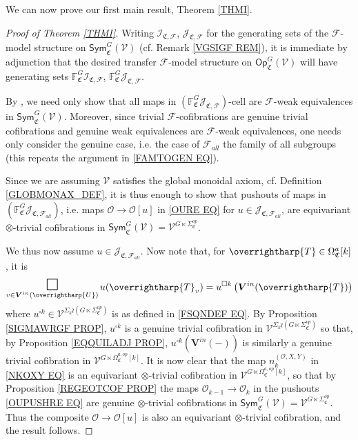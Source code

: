 \documentclass[a4paper,10pt
,draft
]{article}%
\numberwithin{equation}{section}
\numberwithin{figure}{section}
\theoremstyle{definition} %
\newcommand{\vect}[1]{\text{\overrightharp{\ensuremath{#1}}}}
\newcommand{\F}{\ensuremath{\mathcal F}}
\newcommand{\V}{\ensuremath{\mathcal V}}
\renewcommand{\O}{\ensuremath{\mathcal O}}
\newcommand{\1}{\ensuremath{\mathbbm 1}}%
\begin{document}
We can now prove our first main result, Theorem \ref{THMI}.


\begin{proof}[Proof of Theorem \ref{THMI}]    
	Writing
	$\mathcal{I}_{\mathfrak{C},\mathcal{F}}$,
	$\mathcal{J}_{\mathfrak{C},\mathcal{F}}$
	for the generating sets
	of the $\F$-model structure on 
	$\mathsf{Sym}^G_{\mathfrak{C}}(\V)$
	(cf. Remark \ref{VGSIGF REM}),
	it is immediate by adjunction
	that the desired transfer $\F$-model structure
	on $\mathsf{Op}^G_{\mathfrak{C}}(\V)$
	will have generating sets 
	$\mathbb{F}^G_{\mathfrak{C}}\mathcal{I}_{\mathfrak{C},\mathcal{F}}$,
	$\mathbb{F}^G_{\mathfrak{C}}\mathcal{J}_{\mathfrak{C},\mathcal{F}}$.
	
	By \cite[Thm. 11.3.2]{Hir03},
	we need only show that all maps in
	$(\mathbb{F}^G_{\mathfrak{C}}\mathcal{J}_{\mathfrak{C},\mathcal{F}})$-cell
	are $\F$-weak equivalences in $\mathsf{Sym}^G_{\mathfrak{C}}(\V)$.
	Moreover, since trivial $\F$-cofibrations are genuine trivial cofibrations and 
	genuine weak equivalences are $\F$-weak equivalences, one needs only consider the genuine case, i.e. the case of $\F_{all}$ the family of all subgroups (this repeats the argument in \eqref{FAMTOGEN EQ}).
	
	
	Since we are assuming $\V$ satisfies the global monoidal axiom,
	cf. Definition \ref{GLOBMONAX_DEF}, 
	it is thus enough to show that pushouts of maps in 
	$(\mathbb{F}^G_{\mathfrak{C}}\mathcal{J}_{\mathfrak{C},\mathcal{F}_{all}})$,
	i.e. maps $\O \to \O[u]$ in \eqref{OURE EQ}
	for $u \in \mathcal{J}_{\mathfrak{C},\mathcal{F}_{all}}$,
	are equivariant $\otimes$-trivial cofibrations
	in $\mathsf{Sym}^G_{\mathfrak{C}}(\V) = \V^{G \ltimes \Sigma^{op}_{\mathfrak{C}}}$.
	
	
	
	We thus now assume 
	$u \in \mathcal{J}_{\mathfrak{C},\mathcal{F}_{all}}$.
	Now note that, for $\vect{T} \in \Omega^a_{\mathfrak{C}}[k]$,
	it is
	\[
	\mathop{\mathlarger{\mathlarger{\mathlarger{\square}}}}\limits_{v \in \boldsymbol{V}^{in}(\vect{U})} u(\vect{T}_v)
	=
	u^{\square k}\left( \boldsymbol{V}^{in}(\vect T) \right)
	\]
	where
	$u^{\square k} \in 
	\V^{\Sigma_k \wr (G \ltimes \Sigma^{op}_{\mathfrak{C}})}$
	is as defined in \eqref{FSQNDEF EQ}.
	By Proposition \ref{SIGMAWRGF PROP},
	$u^{\square k}$ is a genuine trivial cofibration in 
	$\V^{\Sigma_k \wr (G \ltimes \Sigma^{op}_{\mathfrak{C}})}$
	so that,
	by Proposition \ref{EQQUILADJ PROP},
	$u^{\square k}(\boldsymbol{V}^{in}(-))$
	is similarly a genuine trivial cofibration in 
	$\V^{G \ltimes \Omega^{a,op}_{\mathfrak{C}}[k]}$.
	It is now clear that
	the map $n_k^{(\O,X,Y)}$ in \eqref{NKOXY EQ}
	is an equivariant
	$\otimes$-trivial cofibration in 
	$\V^{G \ltimes \Omega^{a,op}_{\mathfrak{C}}[k]}$,
	so that by 
	Proposition \ref{REGEOTCOF PROP}
	the maps $\O_{k-1} \to \O_{k}$
	in the pushouts \eqref{OUPUSHRE EQ}
	are genuine $\otimes$-trivial cofibrations
	in 
	$\mathsf{Sym}^G_{\mathfrak{C}}(\V)
	= \V^{G\ltimes \Sigma^{op}_{\mathfrak{C}}}$.
	Thus the composite $\O \to \O[u]$
	is also an
	equivariant $\otimes$-trivial cofibration,
	and the result follows.
\end{proof}
\end{document}
